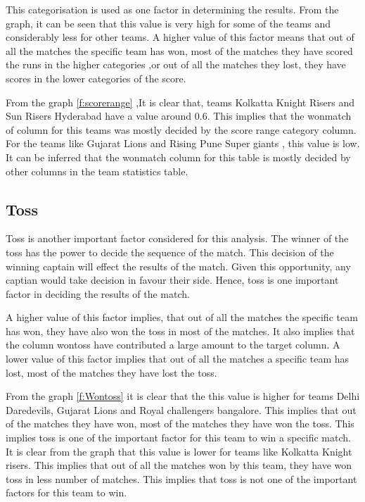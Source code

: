 \documentclass[sigconf]{acmart}
\begin{document}
  This categorisation is used as one factor in determining the results. From the graph, it can be seen that this value is very high for some of the teams and considerably less for other teams. A higher value of this factor means that out of all the matches the specific team has won, most of the matches they have scored the runs in the higher categories ,or out of all the matches they lost, they have scores in the lower categories of the score. 

 From the graph \ref{f:scorerange} ,It is clear that, teams Kolkatta Knight Risers and Sun Risers Hyderabad have a value around 0.6. This implies that the wonmatch of column for this teams was mostly decided by the score range category column. For the teams like Gujarat Lions and Rising Pune Super giants , this value is low. It can be inferred that the wonmatch column for this table is mostly decided by other columns in the team statistics table.
 
\subsection{Toss}

Toss is another important factor considered for this analysis. The winner of the toss has the power to decide the sequence of the match. This decision of the winning captain will effect the results of the match. Given this opportunity, any captian would take decision in favour their side. Hence, toss is one important factor in deciding the results of the match. 

A higher value of this factor implies, that out of all the matches the specific team has won, they have also won the toss in most of the matches. It also implies that the column wontoss have contributed a large amount to the target column. A lower value of this factor implies that out of all the matches a specific team has lost, most of the matches they have lost the toss. 

 From the graph \ref{f:Wontoss} it is clear that the this value is higher for teams Delhi Daredevils, Gujarat Lions and Royal challengers bangalore. This implies that out of the matches they have won, most of the matches they have won the toss. This implies toss is one of the important factor for this team to win a specific match. It is clear from the graph that this value is lower for teams like Kolkatta Knight risers. This implies that out of all the matches won by this team, they have won toss in less number of matches. This implies that toss is not one of the important factors for this team to win. 
 
\end{document}
